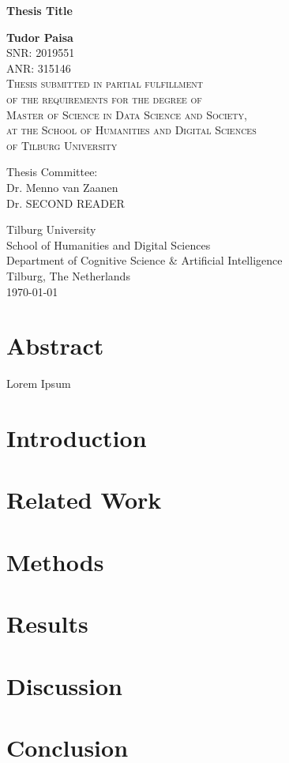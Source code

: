 \documentclass[a4paper]{book}
\begin{document}
\begin{titlepage}
    \begin{center}
        \huge\textbf{Thesis Title}
        \normalsize

        \vspace{1cm}

        \textbf{Tudor Paisa}\\
        SNR: 2019551\\
        ANR: 315146\\

        \vspace{1cm}
        \textsc{Thesis submitted in partial fulfillment\\
        of the requirements for the degree of\\
        Master of Science in Data Science and Society,\\
        at the School of Humanities and Digital Sciences\\
        of Tilburg University\\}

        \vspace{2cm}
        Thesis Committee:\\
        Dr. Menno van Zaanen\\
        Dr. SECOND READER\\
        \vfill

        Tilburg University\\
        School of Humanities and Digital Sciences\\
        Department of Cognitive Science \& Artificial Intelligence\\
        Tilburg, The Netherlands\\
        \today
 
    \end{center}
\end{titlepage}

\chapter*{Abstract}
    Lorem Ipsum

\tableofcontents

\chapter{Introduction}

\chapter{Related Work}

\chapter{Methods}

\chapter{Results}

\chapter{Discussion}

\chapter{Conclusion}
\end{document}
